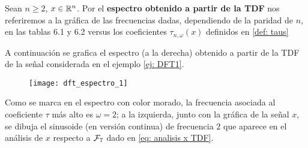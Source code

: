 \begin{defi}
Sean $n \geq 2$,  $x \in \mathbb{R}^{n}$. Por el 
\textbf{espectro obtenido a partir de la TDF} nos referiremos
a la gráfica de las frecuencias dadas, dependiendo de la
paridad de $n$, en las tablas 
6.1 y 6.2
versus los coeficientes $\tau_{n, \omega}(x)$
definidos en \ref{def: taus}
\end{defi}

\begin{ejemplo}
A continuación se grafica el espectro
(a la derecha) obtenido
a partir de la TDF de la señal considerada en el 
ejemplo \ref{ej: DFT1}.

\begin{figure}[H]
	\centering
	\texttt{[image: dft\_espectro\_1]} 
\end{figure}	

Como se marca en el espectro con color morado, la frecuencia
asociada al coeficiente $\tau$ más alto es $\omega =2$; a la
izquierda, junto con la gráfica de la señal 
$x$, se dibuja el sinusoide (en versión continua)
de frecuencia $2$ que aparece en el análisis de
$x$ respecto a $\mathcal{F}_{7}$ dado en 
\eqref{eq: analisis x TDF}.
\final
\end{ejemplo}